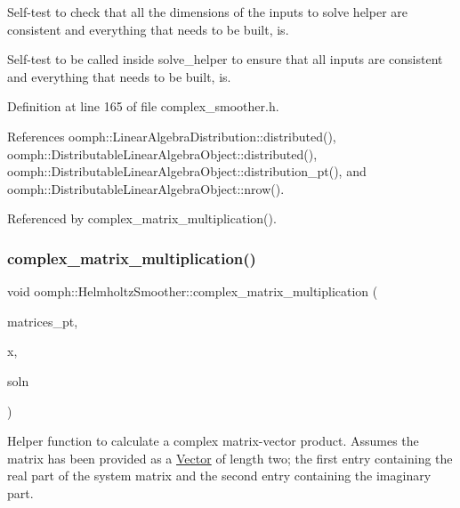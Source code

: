 Self-\/test to check that all the dimensions of the inputs to solve helper are consistent and everything that needs to be built, is. 

Self-\/test to be called inside solve\+\_\+helper to ensure that all inputs are consistent and everything that needs to be built, is. 

Definition at line 165 of file complex\+\_\+smoother.\+h.



References oomph\+::\+Linear\+Algebra\+Distribution\+::distributed(), oomph\+::\+Distributable\+Linear\+Algebra\+Object\+::distributed(), oomph\+::\+Distributable\+Linear\+Algebra\+Object\+::distribution\+\_\+pt(), and oomph\+::\+Distributable\+Linear\+Algebra\+Object\+::nrow().



Referenced by complex\+\_\+matrix\+\_\+multiplication().

\mbox{\label{classoomph_1_1HelmholtzSmoother_a1c37bee4dbcfcc0933a18df8515783c8}} 
\subsubsection{\texorpdfstring{complex\+\_\+matrix\+\_\+multiplication()}{complex\_matrix\_multiplication()}}
{\footnotesize\ttfamily void oomph\+::\+Helmholtz\+Smoother\+::complex\+\_\+matrix\+\_\+multiplication (\begin{DoxyParamCaption}\item[{\hyperlink{classoomph_1_1Vector}{Vector}$<$ \hyperlink{classoomph_1_1CRDoubleMatrix}{C\+R\+Double\+Matrix} $\ast$$>$}]{matrices\+\_\+pt,  }\item[{const \hyperlink{classoomph_1_1Vector}{Vector}$<$ \hyperlink{classoomph_1_1DoubleVector}{Double\+Vector} $>$ \&}]{x,  }\item[{\hyperlink{classoomph_1_1Vector}{Vector}$<$ \hyperlink{classoomph_1_1DoubleVector}{Double\+Vector} $>$ \&}]{soln }\end{DoxyParamCaption})\hspace{0.3cm}{\ttfamily [inline]}}



Helper function to calculate a complex matrix-\/vector product. Assumes the matrix has been provided as a \hyperlink{classoomph_1_1Vector}{Vector} of length two; the first entry containing the real part of the system matrix and the second entry containing the imaginary part. 



